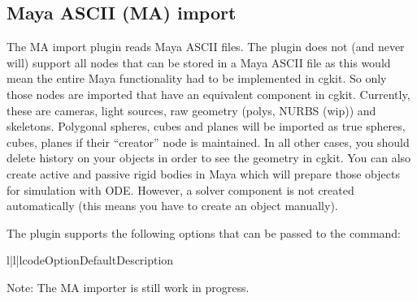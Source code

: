 
\subsection{Maya ASCII (MA) import}

The MA import plugin reads Maya ASCII files. The plugin does not (and
never will) support all nodes that can be stored in a Maya ASCII file
as this would mean the entire Maya functionality had to be implemented
in cgkit.  So only those nodes are imported that have an equivalent
component in cgkit.  Currently, these are cameras, light sources, raw
geometry (polys, NURBS (wip)) and skeletons. Polygonal spheres, cubes
and planes will be imported as true spheres, cubes, planes if their ``creator''
node is maintained. In all other cases, you should delete history on your
objects in order to see the geometry in cgkit. You can also create 
active and passive rigid bodies in Maya which will prepare those objects
for simulation with ODE. However, a solver component is not created
automatically (this means you have to create an  object
manually).

The plugin supports the following options that can be passed to
the  command:

\begin{tableiii}{l|l|l}{code}{Option}{Default}{Description}
\end{tableiii}

Note: The MA importer is still work in progress.
